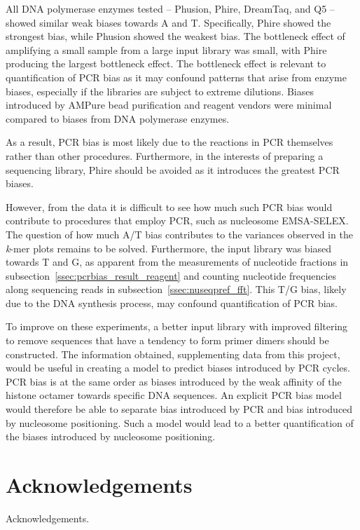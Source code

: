 \documentclass[parskip=full, numbers=noenddot]{scrreprt}
\begin{document}
All DNA polymerase enzymes tested -- Phusion, Phire, DreamTaq, and Q5  -- showed similar weak biases towards A and T.  Specifically, Phire showed the strongest bias, while Phusion showed the weakest bias.  The bottleneck effect of amplifying a small sample from a large input library was small, with Phire producing the largest bottleneck effect.  The bottleneck effect is relevant to quantification of PCR bias as it may confound patterns that arise from enzyme biases, especially if the libraries are subject to extreme dilutions.  Biases introduced by AMPure bead purification and reagent vendors were minimal compared to biases from DNA polymerase enzymes.

As a result, PCR bias is most likely due to the reactions in PCR themselves rather than other procedures.  Furthermore, in the interests of preparing a sequencing library, Phire should be avoided as it introduces the greatest PCR biases.

However, from the data it is difficult to see how much such PCR bias would contribute to procedures that employ PCR, such as nucleosome EMSA-SELEX.  The question of how much A/T bias contributes to the variances observed in the \emph{k}-mer plots remains to be solved.  Furthermore, the input library was biased towards T and G, as apparent from the measurements of nucleotide fractions in subsection~\ref{ssec:pcrbias_result_reagent} and counting nucleotide frequencies along sequencing reads in subsection~\ref{ssec:nuseqpref_fft}.  This T/G bias, likely due to the DNA synthesis process, may confound quantification of PCR bias.

To improve on these experiments, a better input library with improved filtering to remove sequences that have a tendency to form primer dimers should be constructed.  The information obtained, supplementing data from this project, would be useful in creating a model to predict biases introduced by PCR cycles.  PCR bias is at the same order as biases introduced by the weak affinity of the histone octamer towards specific DNA sequences.  An explicit PCR bias model would therefore be able to separate bias introduced by PCR and bias introduced by nucleosome positioning.  Such a model would lead to a better quantification of the biases introduced by nucleosome positioning.

\chapter{Acknowledgements}
\label{ch:ack}

Acknowledgements.

\printbibliography
\end{document}
